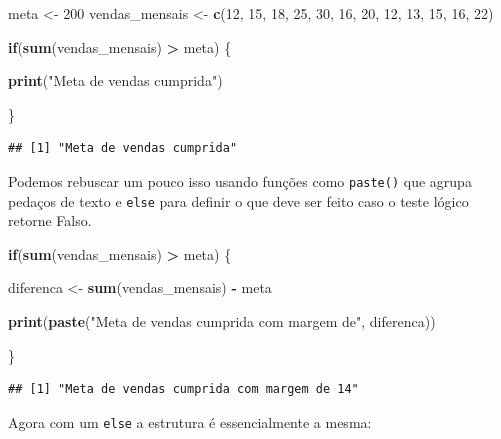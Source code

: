 \documentclass[
]{article}
\newenvironment{Shaded}{\begin{snugshade}}{\end{snugshade}}
\newcommand{\ControlFlowTok}[1]{\textcolor[rgb]{0.13,0.29,0.53}{\textbf{#1}}}
\newcommand{\DecValTok}[1]{\textcolor[rgb]{0.00,0.00,0.81}{#1}}
\newcommand{\KeywordTok}[1]{\textcolor[rgb]{0.13,0.29,0.53}{\textbf{#1}}}
\newcommand{\NormalTok}[1]{#1}
\newcommand{\OperatorTok}[1]{\textcolor[rgb]{0.81,0.36,0.00}{\textbf{#1}}}
\newcommand{\StringTok}[1]{\textcolor[rgb]{0.31,0.60,0.02}{#1}}
\begin{document}
\begin{Shaded}
\begin{Highlighting}[]
\NormalTok{meta <-}\StringTok{ }\DecValTok{200}
\NormalTok{vendas_mensais <-}\StringTok{ }\KeywordTok{c}\NormalTok{(}\DecValTok{12}\NormalTok{, }\DecValTok{15}\NormalTok{, }\DecValTok{18}\NormalTok{, }\DecValTok{25}\NormalTok{, }\DecValTok{30}\NormalTok{, }\DecValTok{16}\NormalTok{, }\DecValTok{20}\NormalTok{, }\DecValTok{12}\NormalTok{, }\DecValTok{13}\NormalTok{, }\DecValTok{15}\NormalTok{, }\DecValTok{16}\NormalTok{, }\DecValTok{22}\NormalTok{)}

\ControlFlowTok{if}\NormalTok{(}\KeywordTok{sum}\NormalTok{(vendas_mensais) }\OperatorTok{>}\StringTok{ }\NormalTok{meta) \{}
  
  \KeywordTok{print}\NormalTok{(}\StringTok{"Meta de vendas cumprida"}\NormalTok{)}

\NormalTok{  \}}
\end{Highlighting}
\end{Shaded}

\begin{verbatim}
## [1] "Meta de vendas cumprida"
\end{verbatim}

Podemos rebuscar um pouco isso usando funções como \texttt{paste()} que
agrupa pedaços de texto e \texttt{else} para definir o que deve ser
feito caso o teste lógico retorne Falso.

\begin{Shaded}
\begin{Highlighting}[]
\ControlFlowTok{if}\NormalTok{(}\KeywordTok{sum}\NormalTok{(vendas_mensais) }\OperatorTok{>}\StringTok{ }\NormalTok{meta) \{}
  
\NormalTok{  diferenca <-}\StringTok{ }\KeywordTok{sum}\NormalTok{(vendas_mensais) }\OperatorTok{-}\StringTok{ }\NormalTok{meta}
  
  \KeywordTok{print}\NormalTok{(}\KeywordTok{paste}\NormalTok{(}\StringTok{"Meta de vendas cumprida com margem de"}\NormalTok{, diferenca))}

\NormalTok{  \} }
\end{Highlighting}
\end{Shaded}

\begin{verbatim}
## [1] "Meta de vendas cumprida com margem de 14"
\end{verbatim}

Agora com um \texttt{else} a estrutura é essencialmente a mesma:
\end{document}
